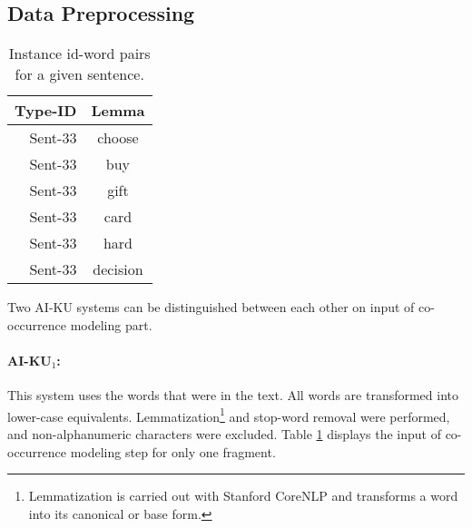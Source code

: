 \documentclass[11pt]{article}
\begin{document}
\subsection{Data Preprocessing}


\begin{table}
\begin{center}
\begin{tabular}{|r|c|}
\hline \bf Type-ID & \bf Lemma \\ \hline
Sent-33 & choose \\
Sent-33 & buy \\
Sent-33 & gift \\
Sent-33 & card \\
Sent-33 & hard \\
Sent-33 & decision \\
\hline
\end{tabular}
\end{center}
\caption{\label{tab:system1_input} Instance id-word pairs for a given sentence.}
\end{table}


\begin{table*}[htbp]
\caption{Contexts and substitute distributions when a bigram language model is used. $w$ and $n$ denote an arbitrary word in the vocabulary and the vocabulary size, respectively.}
\label{tab:subs_exp}
\end{table*}

Two AI-KU systems can be distinguished between each other on input of co-occurrence modeling part. 

\paragraph{AI-KU$_1$:} This system uses the words that were in the text. All words are transformed into lower-case equivalents. Lemmatization\footnote{Lemmatization is carried out with Stanford CoreNLP and transforms a word into its canonical or base form.} and stop-word removal were performed, and non-alphanumeric characters were excluded. 
Table \ref{tab:system1_input} displays the input of co-occurrence modeling step for only one fragment.
\end{document}
